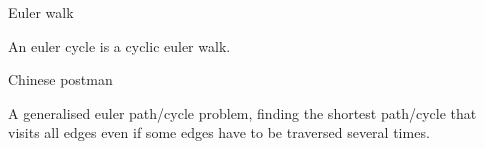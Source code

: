 
\begin{algorithm}{Euler walk}

An euler cycle is a cyclic euler walk.
\end{algorithm}

\begin{algorithm}{Chinese postman}
\keyword{}

A generalised euler path/cycle problem, finding the shortest path/cycle that
visits all edges even if some edges have to be traversed several times.
\end{algorithm}
